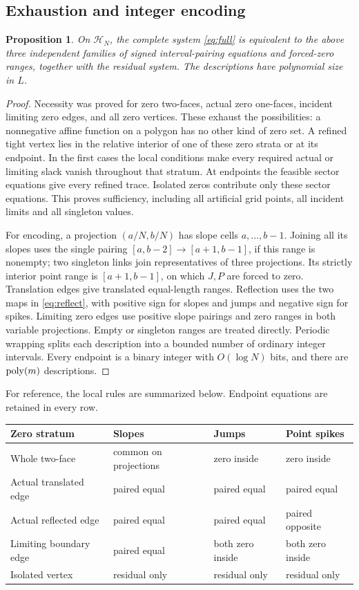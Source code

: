 \documentclass[11pt]{article}
\newtheorem{proposition}[theorem]{Proposition}
\begin{document}
\subsection{Exhaustion and integer encoding}
\begin{proposition}\label{prop:compression}
On $\mathcal H_N$, the complete system \eqref{eq:full} is equivalent to the above three independent families of signed interval-pairing equations and forced-zero ranges, together with the residual system. The descriptions have polynomial size in $L$.
\end{proposition}
\begin{proof}
Necessity was proved for zero two-faces, actual zero one-faces, incident limiting zero edges, and all zero vertices. These exhaust the possibilities: a nonnegative affine function on a polygon has no other kind of zero set. A refined tight vertex lies in the relative interior of one of these zero strata or at its endpoint. In the first cases the local conditions make every required actual or limiting slack vanish throughout that stratum. At endpoints the feasible sector equations give every refined trace. Isolated zeros contribute only these sector equations. This proves sufficiency, including all artificial grid points, all incident limits and all singleton values.

For encoding, a projection $(a/N,b/N)$ has slope cells $a,\ldots,b-1$. Joining all its slopes uses the single pairing $[a,b-2]\to[a+1,b-1]$, if this range is nonempty; two singleton links join representatives of three projections. Its strictly interior point range is $[a+1,b-1]$, on which $J,P$ are forced to zero. Translation edges give translated equal-length ranges. Reflection uses the two maps in \eqref{eq:reflect}, with positive sign for slopes and jumps and negative sign for spikes. Limiting zero edges use positive slope pairings and zero ranges in both variable projections. Empty or singleton ranges are treated directly. Periodic wrapping splits each description into a bounded number of ordinary integer intervals. Every endpoint is a binary integer with $O(\log N)$ bits, and there are $\operatorname{poly}(m)$ descriptions.
\end{proof}

For reference, the local rules are summarized below. Endpoint equations are retained in every row.
\begin{center}\small
\begin{tabular}{llll}
\toprule
Zero stratum & Slopes & Jumps & Point spikes\\
\midrule
Whole two-face & common on projections & zero inside & zero inside\\
Actual translated edge & paired equal & paired equal & paired equal\\
Actual reflected edge & paired equal & paired equal & paired opposite\\
Limiting boundary edge & paired equal & both zero inside & both zero inside\\
Isolated vertex & residual only & residual only & residual only\\
\bottomrule
\end{tabular}
\end{center}
\end{document}
